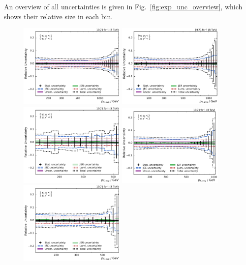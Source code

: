 An overview of all uncertainties is given in Fig.~\ref{fig:exp_unc_overview},
which shows their relative size in each bin.

\begin{figure}[htbp]
    \centering
    \includegraphics[width=0.46\textwidth]{figures/measurement/exp_unc_overview_yb0ys0.pdf}\hfill
    \includegraphics[width=0.46\textwidth]{figures/measurement/exp_unc_overview_yb0ys1.pdf}
    \includegraphics[width=0.46\textwidth]{figures/measurement/exp_unc_overview_yb0ys2.pdf}\hfill
    \includegraphics[width=0.46\textwidth]{figures/measurement/exp_unc_overview_yb1ys0.pdf}
    \includegraphics[width=0.46\textwidth]{figures/measurement/exp_unc_overview_yb1ys1.pdf}\hfill

\end{figure}
